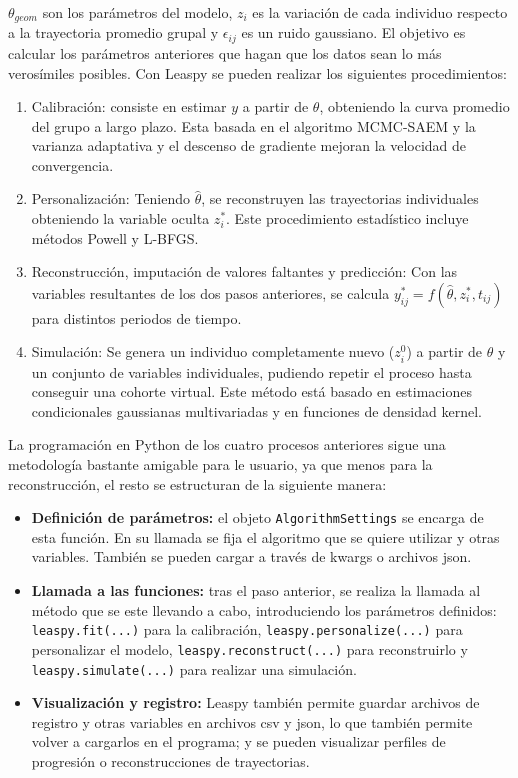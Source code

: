 $\theta_{geom}$ son los parámetros del modelo, $z_{i}$ es la variación de cada individuo respecto a la trayectoria promedio grupal y $\epsilon_{ij}$ es un ruido gaussiano. El objetivo es calcular los parámetros anteriores que hagan que los datos sean lo más verosímiles posibles. Con Leaspy se pueden realizar los siguientes procedimientos:
\begin{enumerate}
	\item Calibración: consiste en estimar $y$ a partir de $\theta$, obteniendo la curva promedio del grupo a largo plazo. Esta basada en el algoritmo MCMC-SAEM y la varianza adaptativa y el descenso de gradiente mejoran la velocidad de convergencia.
	\item Personalización: Teniendo $\hat{\theta}$, se reconstruyen las trayectorias individuales obteniendo la variable oculta $z_{i}^{*}$. Este procedimiento estadístico incluye métodos Powell y L-BFGS.
	\item Reconstrucción, imputación de valores faltantes y predicción: Con las variables resultantes de los dos pasos anteriores, se calcula $y_{ij}^{*}=f(\hat{\theta}, z_{i}^{*}, t_{ij})$ para distintos periodos de tiempo.
	\item Simulación: Se genera un individuo completamente nuevo ($z_{i}^{0}$) a partir de $\hat{\theta}$ y un conjunto de variables individuales, pudiendo repetir el proceso hasta conseguir una cohorte virtual. Este método está basado en estimaciones condicionales gaussianas multivariadas y en funciones de densidad kernel.	
\end{enumerate}

La programación en Python de los cuatro procesos anteriores sigue una metodología bastante amigable para le usuario, ya que menos para la reconstrucción, el resto se estructuran de la siguiente manera:
\begin{itemize}
	\item \textbf{Definición de parámetros:} el objeto \texttt{AlgorithmSettings} se encarga de esta función. En su llamada se fija el algoritmo que se quiere utilizar y otras variables. También se pueden cargar a través de kwargs o archivos json.
	\item \textbf{Llamada a las funciones:} tras el paso anterior, se realiza la llamada al método que se este llevando a cabo, introduciendo los parámetros definidos: \texttt{leaspy.fit(...)} para la calibración, \texttt{leaspy.personalize(...)} para personalizar el modelo, \texttt{leaspy.reconstruct(...)} para reconstruirlo y\\\texttt{leaspy.simulate(...)} para realizar una simulación.
	\item \textbf{Visualización y registro:} Leaspy también permite guardar archivos de registro y otras variables en archivos csv y json, lo que también permite volver a cargarlos en el programa; y se pueden visualizar perfiles de progresión o reconstrucciones de trayectorias.
\end{itemize}

